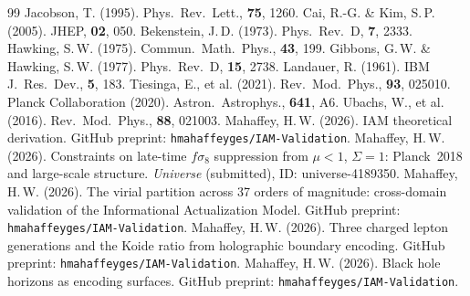 \documentclass[12pt,a4paper]{article}
\begin{document}
\begin{thebibliography}{99}
 Jacobson, T. (1995). Phys.\ Rev.\ Lett., \textbf{75}, 1260.
 Cai, R.-G. \& Kim, S.\,P. (2005). JHEP, \textbf{02}, 050.
 Bekenstein, J.\,D. (1973). Phys.\ Rev.\ D, \textbf{7}, 2333.
 Hawking, S.\,W. (1975). Commun.\ Math.\ Phys., \textbf{43}, 199.
 Gibbons, G.\,W. \& Hawking, S.\,W. (1977). Phys.\ Rev.\ D, \textbf{15}, 2738.
 Landauer, R. (1961). IBM J.\ Res.\ Dev., \textbf{5}, 183.
 Tiesinga, E., et al. (2021). Rev.\ Mod.\ Phys., \textbf{93}, 025010.
 Planck Collaboration (2020). Astron.\ Astrophys., \textbf{641}, A6.
 Ubachs, W., et al. (2016). Rev.\ Mod.\ Phys., \textbf{88}, 021003.
 Mahaffey, H.\,W. (2026). IAM theoretical derivation. GitHub preprint: \texttt{hmahaffeyges/IAM-Validation}.
 Mahaffey, H.\,W. (2026). Constraints on late-time $f\sigma_8$ suppression from $\mu < 1$, $\Sigma = 1$: Planck~2018 and large-scale structure. \textit{Universe} (submitted), ID: universe-4189350.
 Mahaffey, H.\,W. (2026). The virial partition across 37 orders of magnitude: cross-domain validation of the Informational Actualization Model. GitHub preprint: \texttt{hmahaffeyges/IAM-Validation}.
 Mahaffey, H.\,W. (2026). Three charged lepton generations and the Koide ratio from holographic boundary encoding. GitHub preprint: \texttt{hmahaffeyges/IAM-Validation}.
 Mahaffey, H.\,W. (2026). Black hole horizons as encoding surfaces. GitHub preprint: \texttt{hmahaffeyges/IAM-Validation}.
\end{thebibliography}
\end{document}
